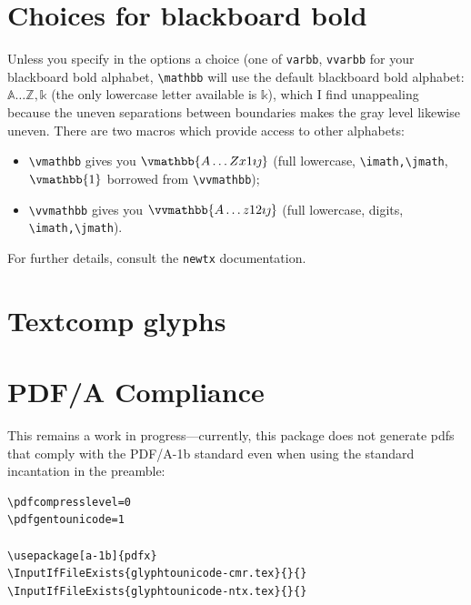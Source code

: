\documentclass[11pt]{article}
\theoremstyle{oldplain}
\theoremstyle{plain}
\begin{document}
\section*{Choices for blackboard bold}
Unless you specify in the options a choice (one of {\tt varbb}, {\tt vvarbb} for your blackboard bold alphabet, \verb|\mathbb| will use the default blackboard bold alphabet: $\mathbb{A\dots Z, k}$ (the only lowercase letter available is $\mathbb{k}$), which I find unappealing because the uneven separations between boundaries makes the gray level likewise uneven. There are  two macros which provide access to other alphabets: 
\begin{itemize}
\item
\verb|\vmathbb| gives you $\vmathbb{A\dots Z x 1\imath\jmath}$ (full lowercase, \verb|\imath,\jmath|, $\vmathbb{1}$ borrowed from \verb|\vvmathbb|);
\item \verb|\vvmathbb| gives you $\vvmathbb{A\dots z12\imath\jmath}$ (full lowercase, digits, \verb|\imath,\jmath|).
\end{itemize}
For further details, consult the {\tt newtx} documentation.

\section*{Textcomp glyphs}


\section*{PDF/A Compliance}
This remains a work in progress---currently, this package does not generate pdfs that comply with the PDF/A-1b standard even when using the standard incantation in the preamble:
\begin{verbatim}
\pdfcompresslevel=0
\pdfgentounicode=1

\usepackage[a-1b]{pdfx}
\InputIfFileExists{glyphtounicode-cmr.tex}{}{}
\InputIfFileExists{glyphtounicode-ntx.tex}{}{}
\end{verbatim}
\end{document}
